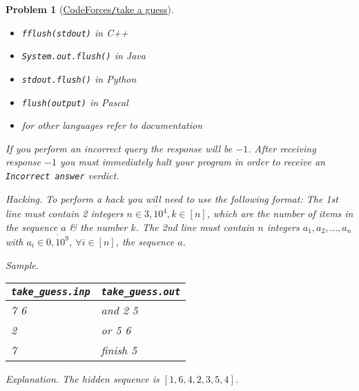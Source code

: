 \documentclass{article}
\newtheorem{problem}{Problem}
\begin{document}
\begin{problem}[\href{https://codeforces.com/contest/1556/problem/D?locale=en}{CodeForces{\tt/}take a guess}]
    \begin{itemize}
        \item {\tt fflush(stdout)} in C++
        \item {\tt System.out.flush()} in Java
        \item {\tt stdout.flush()} in Python
        \item {\tt flush(output)} in Pascal
        \item for other languages refer to documentation
    \end{itemize}
    If you perform an incorrect query the response will be $-1$. After receiving response $-1$ you must immediately halt your program in order to receive an {\tt Incorrect answer} verdict.
    \item {\sf Hacking.} To perform a hack you will need to use the following format: The 1st line must contain 2 integers $n\in\overline{3,10^4},k\in[n]$, which are the number of items in the sequence $a$ \& the number $k$. The 2nd line must contain $n$ integers $a_1,a_2,\ldots,a_n$ with $a_i\in\overline{0,10^9}$, $\forall i\in[n]$, the sequence $a$.
    \item {\sf Sample.}
    \begin{table}[H]
        \centering
        \begin{tabular}{|l|l|}
            \hline
            \verb|take_guess.inp| & \verb|take_guess.out| \\
            \hline
            7 6 & and 2 5 \\
            2 & or 5 6 \\
            7 & finish 5 \\
            \hline
        \end{tabular}
    \end{table}
    \item {\sf Explanation.} The hidden sequence is $[1,6,4,2,3,5,4]$.
\end{problem}
\end{document}

